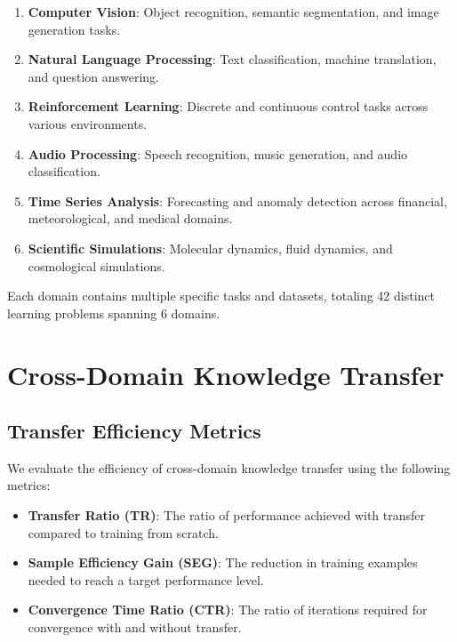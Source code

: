 \begin{enumerate}
    \item \textbf{Computer Vision}: Object recognition, semantic segmentation, and image generation tasks.
    
    \item \textbf{Natural Language Processing}: Text classification, machine translation, and question answering.
    
    \item \textbf{Reinforcement Learning}: Discrete and continuous control tasks across various environments.
    
    \item \textbf{Audio Processing}: Speech recognition, music generation, and audio classification.
    
    \item \textbf{Time Series Analysis}: Forecasting and anomaly detection across financial, meteorological, and medical domains.
    
    \item \textbf{Scientific Simulations}: Molecular dynamics, fluid dynamics, and cosmological simulations.
\end{enumerate}

Each domain contains multiple specific tasks and datasets, totaling 42 distinct learning problems spanning 6 domains.

\section{Cross-Domain Knowledge Transfer}

\subsection{Transfer Efficiency Metrics}

We evaluate the efficiency of cross-domain knowledge transfer using the following metrics:

\begin{itemize}
    \item \textbf{Transfer Ratio (TR)}: The ratio of performance achieved with transfer compared to training from scratch.
    
    \item \textbf{Sample Efficiency Gain (SEG)}: The reduction in training examples needed to reach a target performance level.
    
    \item \textbf{Convergence Time Ratio (CTR)}: The ratio of iterations required for convergence with and without transfer.
\end{itemize}

